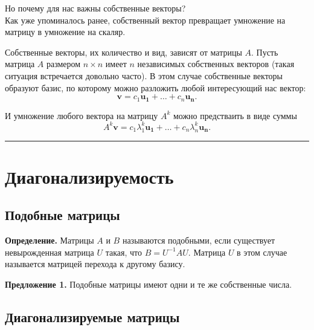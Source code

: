 \documentclass[11pt,a4paper]{article}
\renewcommand{\linethickness}{0.1ex}
\begin{document}
    Но почему для нас важны собственные векторы?\\
Как уже упоминалось ранее, собственный вектор превращает умножение на
матрицу в умножение на скаляр.

Собственные векторы, их количество и вид, зависят от матрицы \(A\).
Пусть матрица \(A\) размером \(n \times n\) имеет \(n\) независимых
собственных векторов (такая ситуация встречается довольно часто). В этом
случае собственные векторы образуют базис, по которому можно разложить
любой интересующий нас вектор:
\[ \mathbf{v} = c_1\mathbf{u_1} + \ldots + c_n\mathbf{u_n}. \]

И умножение любого вектора на матрицу \(A^k\) можно предстваить в виде
суммы
\[ A^k\mathbf{v} = c_1\lambda_1^k\mathbf{u_1} + \ldots + c_n\lambda_n^k\mathbf{u_n}. \]

    \begin{center}\rule{0.5\linewidth}{\linethickness}\end{center}

    \hypertarget{ux434ux438ux430ux433ux43eux43dux430ux43bux438ux437ux438ux440ux443ux435ux43cux43eux441ux442ux44c}{%
\section{Диагонализируемость}\label{ux434ux438ux430ux433ux43eux43dux430ux43bux438ux437ux438ux440ux443ux435ux43cux43eux441ux442ux44c}}

\hypertarget{ux43fux43eux434ux43eux431ux43dux44bux435-ux43cux430ux442ux440ux438ux446ux44b}{%
\subsection{Подобные
матрицы}\label{ux43fux43eux434ux43eux431ux43dux44bux435-ux43cux430ux442ux440ux438ux446ux44b}}

\textbf{Определение.} Матрицы \(A\) и \(B\) называются подобными, если
существует невырожденная матрица \(U\) такая, что \(B = U^{-1}AU\).
Матрица \(U\) в этом случае называется матрицей перехода к другому
базису.

\textbf{Предложение 1.} Подобные матрицы имеют одни и те же собственные
числа.

    \hypertarget{ux434ux438ux430ux433ux43eux43dux430ux43bux438ux437ux438ux440ux443ux435ux43cux44bux435-ux43cux430ux442ux440ux438ux446ux44b}{%
\subsection{Диагонализируемые
матрицы}\label{ux434ux438ux430ux433ux43eux43dux430ux43bux438ux437ux438ux440ux443ux435ux43cux44bux435-ux43cux430ux442ux440ux438ux446ux44b}}
\end{document}
